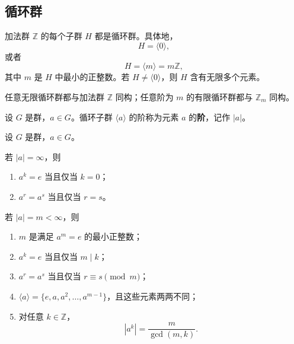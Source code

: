 \subsection{循环群}

\begin{theorem}\label{thm:subgroups-of-integers}
加法群 $\mathbb Z$ 的每个子群 $H$ 都是循环群。具体地，
\[
  H=\langle0\rangle,
\]
或者
\[
  H=\langle m\rangle=m\mathbb Z,
\]
其中 $m$ 是 $H$ 中最小的正整数。若 $H\neq\langle0\rangle$，则 $H$ 含有无限多个元素。
\end{theorem}

\begin{theorem}\label{thm:cyclic-classification}
任意无限循环群都与加法群 $\mathbb Z$ 同构；任意阶为 $m$ 的有限循环群都与 $\mathbb Z_m$ 同构。
\end{theorem}

\begin{definition}[元素的阶]\label{def:element-order}
设 $G$ 是群，$a\in G$。循环子群 $\langle a\rangle$ 的阶称为元素 $a$ 的\textbf{阶}，记作 $|a|$。
\end{definition}

\begin{theorem}\label{thm:order-powers}
设 $G$ 是群，$a\in G$。

若 $|a|=\infty$，则
\begin{enumerate}[label=(\arabic*)]
  \item $a^k=e$ 当且仅当 $k=0$；
  \item $a^r=a^s$ 当且仅当 $r=s$。
\end{enumerate}

若 $|a|=m<\infty$，则
\begin{enumerate}[label=(\arabic*),resume]
  \item $m$ 是满足 $a^m=e$ 的最小正整数；
  \item $a^k=e$ 当且仅当 $m\mid k$；
  \item $a^r=a^s$ 当且仅当 $r\equiv s\pmod m$；
  \item $\langle a\rangle=\{e,a,a^2,\ldots,a^{m-1}\}$，且这些元素两两不同；
  \item 对任意 $k\in\mathbb Z$，
  \[
    |a^k|=\frac{m}{\gcd(m,k)}.
  \]
\end{enumerate}
\end{theorem}


